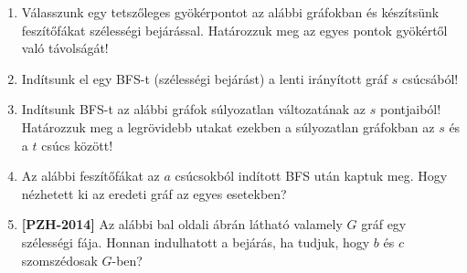 \documentclass[a4paper,12pt]{article}
\begin{document}
        \noindent{}
        \begin{enumerate}
            \item Válasszunk egy tetszőleges gyökérpontot az alábbi gráfokban és készítsünk feszítőfákat szélességi bejárással. Határozzuk meg az egyes pontok gyökértől való távolságát!
            \begin{figure}[h]
                \centering
                 \hspace{1in}
                
            \end{figure}

            \item Indítsunk el egy BFS-t (szélességi bejárást) a lenti irányított gráf $s$ csúcsából!
            \begin{figure}[h]
                \centering
                
            \end{figure}
            \item Indítsunk BFS-t az alábbi gráfok súlyozatlan változatának az $s$ pontjaiból! Határozzuk meg a legrövidebb utakat ezekben a súlyozatlan gráfokban az $s$ és a $t$ csúcs között!
        \begin{figure}[!h]
            \centering \hfill
            \hfill
            \hfill \hfill
        \end{figure}
        \item Az alábbi feszítőfákat az $a$ csúcsokból indított BFS után kaptuk meg. Hogy nézhetett ki az eredeti gráf az egyes esetekben? 
        \begin{figure}[!h]
            \centering
            \begin{subfigure}{0.2\textwidth}
                \centering
                
            \end{subfigure}
            \begin{subfigure}{0.2\textwidth}
                \centering		
                
            \end{subfigure}
            \begin{subfigure}{0.2\textwidth}
                \centering
                
            \end{subfigure}
            \begin{subfigure}{0.2\textwidth}
                \centering
                
            \end{subfigure}
        \end{figure}
        \item \textbf{[PZH-2014]} Az alábbi bal oldali ábrán látható valamely $G$ gráf egy szélességi fája. Honnan indulhatott a bejárás, ha tudjuk, hogy $b$ és $c$ szomszédosak $G$-ben?
        

\end{enumerate}
\end{document}
